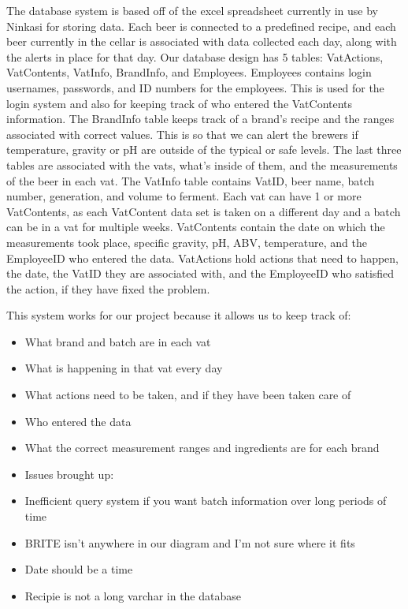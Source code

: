 \documentclass[draftclsnofoot,onecolumn,letterpaper,10pt]{IEEEtran}
\begin{document}
			The database system is based off of the excel spreadsheet currently in use by Ninkasi for storing data.
			Each beer is connected to a predefined recipe, and each beer currently in the cellar is associated with data collected each day, along with the alerts in place for that day.
			Our database design has 5 tables: VatActions, VatContents, VatInfo, BrandInfo, and Employees.
			Employees contains login usernames, passwords, and ID numbers for the employees.
			This is used for the login system and also for keeping track of who entered the VatContents information.
			The BrandInfo table keeps track of a brand’s recipe and the ranges associated with correct values.
			This is so that we can alert the brewers if temperature, gravity or pH are outside of the typical or safe levels.
			The last three tables are associated with the vats, what’s inside of them, and the measurements of the beer in each vat.
			The VatInfo table contains VatID, beer name, batch number, generation, and volume to ferment.
			Each vat can have 1 or more VatContents, as each VatContent data set is taken on a different day and a batch can be in a vat for multiple weeks.
			VatContents contain the date on which the measurements took place, specific gravity, pH, ABV, temperature, and the EmployeeID who entered the data.
			VatActions hold actions that need to happen, the date, the VatID they are associated with, and the EmployeeID who satisfied the action, if they have fixed the problem.

			This system works for our project because it allows us to keep track of:

			\begin{itemize}
				\item What brand and batch are in each vat
				\item What is happening in that vat every day
				\item What actions need to be taken, and if they have been taken care of
				\item Who entered the data
				\item What the correct measurement ranges and ingredients are for each brand
			\end{itemize}

			\begin{itemize}
				\item Issues brought up:
				\item Inefficient query system if you want batch information over long periods of time
				\item BRITE isn’t anywhere in our diagram and I’m not sure where it fits
				\item Date should be a time
				\item Recipie is not a long varchar in the database
			\end{itemize}
\end{document}
